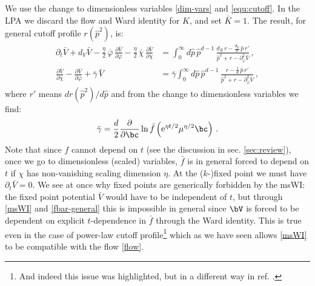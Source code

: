 \documentclass[11pt]{book} %
\newcommand{\be}{\begin{equation}}
\newcommand{\ee}{\end{equation}}
\begin{document}
We use the change to dimensionless variables \eqref{dim-vars} and \eqref{equ:cutoff}. In the LPA we discard the flow and Ward identity for $K$, and set $\bar K=1$. The result, for general cutoff profile $r(\hat{p}^2)$, is:
\begin{align}
\label{flow}
\partial_t \bar V + d_V \bar V - \frac{\eta}{2} \, \bar\varphi \, \frac{\partial \bar V}{\partial \bar\varphi} - \frac{\eta}{2} \, \bar\chi \, \frac{\partial \bar V}{\partial \bar\chi} &=
\int_0^{\infty} d\hat p \, \hat p^{d-1} \, \frac{d_R\, r - \frac{d_V}{d} \, \hat p \, r'}{\hat p^2 + r - \partial^2_{\bar\varphi}\bar V}\,,\\
\label{msWI}
\frac{\partial \bar V}{\partial \bar\chi} - \frac{\partial \bar V}{\partial \bar\varphi} + \bar \gamma \, \bar V &= \bar \gamma
\int_0^{\infty} d\hat p \, \hat p^{d-1} \, \frac{r - \frac{1}{d} \, \hat p \, r'}{\hat p^2 + r - \partial^2_{\bar\varphi}\bar V} \,,
\end{align}
where $r'$ means $dr(\hat{p}^2)/d\hat{p}$ and from the change to dimensionless variables we find:
\be 
\label{fbar-general}
\bar{\gamma} = \frac{d}{2}\frac{\partial}{\partial\bc}\ln\bar{f}\left({\rm e}^{\eta t/2}\mu^{\eta/2}\bc\right)\,.
\ee
Note that since $f$ cannot depend on $t$ (see the discussion in sec. \ref{sec:review}), once we go to dimensionless (\ie scaled) variables, $\bar{f}$ is in general forced to depend on $t$ if $\chi$ has non-vanishing scaling dimension $\eta$.
At the ($k$-)fixed point we must have $\partial_t \bar V = 0$. We see at once why fixed points are generically forbidden by the msWI: the fixed point potential $\bar{V}$ would have to be independent of $t$, but through \eqref{msWI} and \eqref{fbar-general} this is impossible in general since $\bV$ is forced to be dependent on explicit $t$-dependence in $\bar{f}$ through the Ward identity. This is true even in the case of power-law cutoff profile\footnote{And indeed this issue was highlighted, but in a different way in ref. \cite{Dietz:2015owa}.} which as we have seen allows \eqref{msWI} to be compatible with the flow \eqref{flow}.

 
\end{document}
